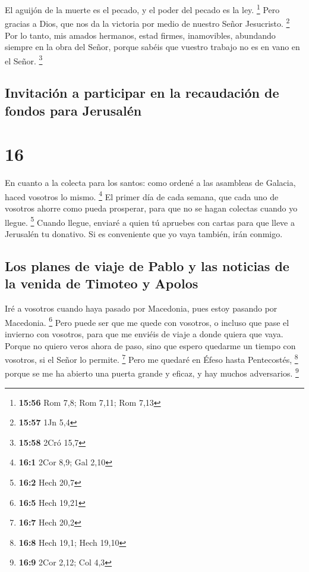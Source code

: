  El aguijón de la muerte es el pecado, y el poder del
pecado es la ley. \footnote{\textbf{15:56} Rom 7,8; Rom 7,11; Rom 7,13}
 Pero gracias a Dios, que nos da la victoria por medio de
nuestro Señor Jesucristo. \footnote{\textbf{15:57} 1Jn 5,4}
 Por lo tanto, mis amados hermanos, estad firmes,
inamovibles, abundando siempre en la obra del Señor, porque sabéis que
vuestro trabajo no es en vano en el Señor. \footnote{\textbf{15:58} 2Cró
  15,7}

\hypertarget{invitaciuxf3n-a-participar-en-la-recaudaciuxf3n-de-fondos-para-jerusaluxe9n}{%
\subsection{Invitación a participar en la recaudación de fondos para
Jerusalén}\label{invitaciuxf3n-a-participar-en-la-recaudaciuxf3n-de-fondos-para-jerusaluxe9n}}

\hypertarget{section-15}{%
\section{16}\label{section-15}}

 En cuanto a la colecta para los santos: como ordené a las
asambleas de Galacia, haced vosotros lo mismo. \footnote{\textbf{16:1}
  2Cor 8,9; Gal 2,10}  El primer día de cada semana, que
cada uno de vosotros ahorre como pueda prosperar, para que no se hagan
colectas cuando yo llegue. \footnote{\textbf{16:2} Hech 20,7}
 Cuando llegue, enviaré a quien tú apruebes con cartas
para que lleve a Jerusalén tu donativo.  Si es conveniente
que yo vaya también, irán conmigo.

\hypertarget{los-planes-de-viaje-de-pablo-y-las-noticias-de-la-venida-de-timoteo-y-apolos}{%
\subsection{Los planes de viaje de Pablo y las noticias de la venida de
Timoteo y
Apolos}\label{los-planes-de-viaje-de-pablo-y-las-noticias-de-la-venida-de-timoteo-y-apolos}}

 Iré a vosotros cuando haya pasado por Macedonia, pues
estoy pasando por Macedonia. \footnote{\textbf{16:5} Hech 19,21}
 Pero puede ser que me quede con vosotros, o incluso que
pase el invierno con vosotros, para que me enviéis de viaje a donde
quiera que vaya.  Porque no quiero veros ahora de paso,
sino que espero quedarme un tiempo con vosotros, si el Señor lo permite.
\footnote{\textbf{16:7} Hech 20,2}  Pero me quedaré en
Éfeso hasta Pentecostés, \footnote{\textbf{16:8} Hech 19,1; Hech 19,10}
 porque se me ha abierto una puerta grande y eficaz, y hay
muchos adversarios. \footnote{\textbf{16:9} 2Cor 2,12; Col 4,3}

